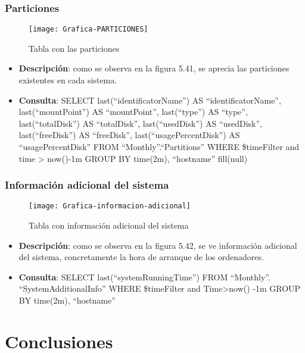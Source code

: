 \documentclass[ spanish, a4paper, 12pt, oneside]{report}
\begin{document}
\subsection{Particiones}

\begin{figure}[!h]
   \centering
   \texttt{[image: Grafica-PARTICIONES]}\\
      \caption{\label{fig: Tabla con las particiones} Tabla con las particiones}
\end{figure}

\begin{itemize}
   \item \textbf{Descripción}: como se observa en la figura 5.41, se aprecia las particiones existentes en cada sistema.
   \item \textbf{Consulta}: SELECT last(``identificatorName'') AS ``identificatorName'', last(``mountPoint'') AS ``mountPoint'', last(``type'') AS ``type'', last(``totalDisk'') AS ``totalDisk'', last(``usedDisk'') AS ``usedDisk'', last(``freeDisk'') AS ``freeDisk'', last(``usagePercentDisk'') AS ``usagePercentDisk'' FROM ``Monthly''.``Partitions'' WHERE \$timeFilter and time > now()-1m GROUP BY time(2m), ``hostname'' fill(null)
\end{itemize}

\subsection{Información adicional del sistema}

\begin{figure}[!h]
   \centering
   \texttt{[image: Grafica-informacion-adicional]}\\
      \caption{\label{fig: Tabla con información adicional del sistema } Tabla con información adicional del sistema}
\end{figure}

\begin{itemize}
   \item \textbf{Descripción}: como se observa en la figura 5.42, se ve información adicional del sistema, concretamente la hora de arranque de los ordenadores.
   \item \textbf{Consulta}: SELECT last(``systemRunningTime'') FROM ``Monthly''. ``SystemAdditionalInfo'' WHERE \$timeFilter and Time>now() -1m GROUP BY time(2m), ``hostname''
\end{itemize}

\chapter{Conclusiones}
\end{document}
